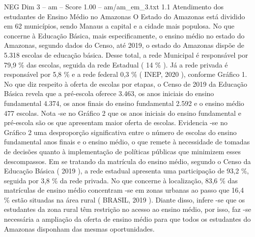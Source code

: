 \begin{textsample}{NEG Dim 3 – am – Score 1.00 – am/am\_em\_3.txt}  \label{ex:f3_neg_253}
1.1 Atendimento dos estudantes de Ensino Médio no Amazonas O Estado do Amazonas está dividido em 62 municípios, sendo Manaus a capital e a cidade mais populosa.
No que concerne à Educação Básica, mais especificamente, o ensino médio no estado do Amazonas, segundo dados do Censo, até 2019, o estado do Amazonas dispõe de 5.318 escolas de educação básica.
Desse total, a rede Municipal é responsável por 79,9 \% das escolas, seguida da rede Estadual ( 14 \% ).
Já a rede privada é responsável por 5,8 \% e a rede federal 0,3 \% ( INEP, 2020 ), conforme Gráfico 1.
No que diz respeito à oferta de escolas por etapas, o Censo de 2019 da Educação Básica revela que a pré-escola oferece 3.463, os anos iniciais do ensino fundamental 4.374, os anos finais do ensino fundamental 2.592 e o ensino médio 477 escolas.
Nota -se no Gráfico 2 que os anos iniciais do ensino fundamental e pré-escola são os que apresentam maior oferta de escolas.
Evidencia -se no Gráfico 2 uma desproporção significativa entre o número de escolas do ensino fundamental anos finais e o ensino médio, o que remete à necessidade de tomadas de decisões quanto à implementação de políticas públicas que minimizem esses descompassos.
Em se tratando da matrícula do ensino médio, segundo o Censo da Educação Básica ( 2019 ), a rede estadual apresenta uma participação de 93,2 \%, seguida por 3,8 \% da rede privada.
No que concerne à localização, 83,6 \% das matrículas de ensino médio concentram -se em zonas urbanas ao passo que 16,4 \% estão situadas na área rural ( BRASIL, 2019 ).
Diante disso, infere -se que os estudantes da zona rural têm restrição no acesso ao ensino médio, por isso, faz -se necessária a ampliação da oferta de ensino médio para que todos os estudantes do Amazonas disponham das mesmas oportunidades.

\end{textsample}
